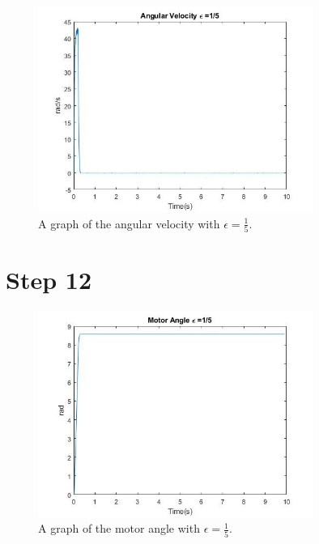 \begin{figure}[H]
	\centering
 	\includegraphics[width=0.8\textwidth]{./figures/lab6_angularvelocitye5.jpg}
	\caption{A graph of the angular velocity with $\epsilon = \frac{1}{5}$.}
	\label{fig:}
\end{figure}

\section{Step 12}
\begin{figure}[H]
	\centering
	\includegraphics[width=0.8\textwidth]{./figures/lab6_motorangle_e_5.jpg}
	\caption{A graph of the motor angle with $\epsilon = \frac{1}{5}$.}
	\label{fig:}
\end{figure}


